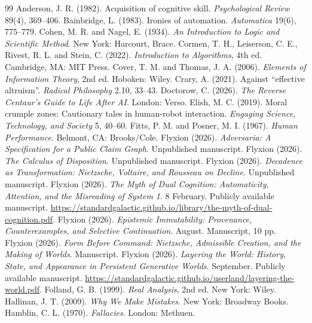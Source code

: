 \documentclass[11pt]{article}
\theoremstyle{definition}
\theoremstyle{remark}
\begin{document}
\begin{thebibliography}{99}
 Anderson, J. R. (1982). Acquisition of cognitive skill. \emph{Psychological Review} 89(4), 369--406.
 Bainbridge, L. (1983). Ironies of automation. \emph{Automatica} 19(6), 775--779.
 Cohen, M. R. and Nagel, E. (1934). \emph{An Introduction to Logic and Scientific Method}. New York: Harcourt, Brace.
 Cormen, T. H., Leiserson, C. E., Rivest, R. L. and Stein, C. (2022). \emph{Introduction to Algorithms}, 4th ed. Cambridge, MA: MIT Press.
 Cover, T. M. and Thomas, J. A. (2006). \emph{Elements of Information Theory}, 2nd ed. Hoboken: Wiley.
 Crary, A. (2021). Against ``effective altruism''. \emph{Radical Philosophy} 2.10, 33--43.
 Doctorow, C. (2026). \emph{The Reverse Centaur's Guide to Life After AI}. London: Verso.
 Elish, M. C. (2019). Moral crumple zones: Cautionary tales in human-robot interaction. \emph{Engaging Science, Technology, and Society} 5, 40--60.
 Fitts, P. M. and Posner, M. I. (1967). \emph{Human Performance}. Belmont, CA: Brooks/Cole.
 Flyxion (2026). \emph{Adversaria: A Specification for a Public Claim Graph}. Unpublished manuscript.
 Flyxion (2026). \emph{The Calculus of Disposition}. Unpublished manuscript.
 Flyxion (2026). \emph{Decadence as Transformation: Nietzsche, Voltaire, and Rousseau on Decline}. Unpublished manuscript.
 Flyxion (2026). \emph{The Myth of Dual Cognition: Automaticity, Attention, and the Misreading of System 1}. 8 February. Publicly available manuscript. \url{https://standardgalactic.github.io/library/the-myth-of-dual-cognition.pdf}.
 Flyxion (2026). \emph{Epistemic Immutability: Provenance, Counterexamples, and Selective Continuation}. August. Manuscript, 10 pp.
 Flyxion (2026). \emph{Form Before Command: Nietzsche, Admissible Creation, and the Making of Worlds}. Manuscript.
 Flyxion (2026). \emph{Layering the World: History, State, and Appearance in Persistent Generative Worlds}. September. Publicly available manuscript. \url{https://standardgalactic.github.io/userland/layering-the-world.pdf}.
 Folland, G. B. (1999). \emph{Real Analysis}, 2nd ed. New York: Wiley.
 Hallinan, J. T. (2009). \emph{Why We Make Mistakes}. New York: Broadway Books.
 Hamblin, C. L. (1970). \emph{Fallacies}. London: Methuen.

\end{thebibliography}
\end{document}
